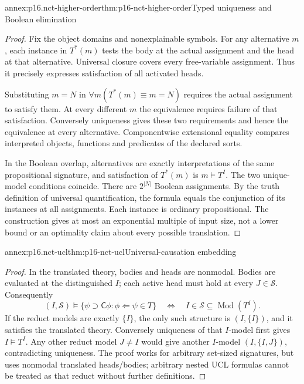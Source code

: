 \begin{annexitem}{annex:p16.nct-higher-order}{thm:p16-nct-higher-order}{Typed uniqueness and Boolean elimination}
\begin{proof}
Fix the object domains and nonexplainable symbols.
For any alternative \(m\), each instance in \(T^*(m)\) tests the body
at the actual assignment and the head at that alternative.
Universal closure covers every free-variable assignment. Thus it
precisely expresses satisfaction of all activated heads.

Substituting \(m=N\) in \(\forall m(T^*(m)\equiv m=N)\) requires
the actual assignment to satisfy them. At every different \(m\) the
equivalence requires failure of that satisfaction. Conversely uniqueness
gives these two requirements and hence the equivalence at every alternative.
Componentwise extensional equality compares interpreted objects, functions
and predicates of the declared sorts.

In the Boolean overlap, alternatives are exactly interpretations of the
same propositional signature, and satisfaction of \(T^*(m)\) is
\(m\models T^I\). The two unique-model conditions coincide.
There are \(2^{|N|}\) Boolean assignments. By the truth definition of
universal quantification, the formula equals the conjunction of its
instances at all assignments. Each instance is ordinary propositional.
The construction gives at most an exponential multiple of input size,
not a lower bound or an optimality claim about every possible translation.
\end{proof}
\end{annexitem}

\begin{annexitem}{annex:p16.nct-ucl}{thm:p16-nct-ucl}{Universal-causation embedding}
\begin{proof}
In the translated theory, bodies and heads are nonmodal.
Bodies are evaluated at the distinguished \(I\); each active head must
hold at every \(J\in\mathcal S\). Consequently
\[
 (I,\mathcal S)\models\{\psi\supset\mathsf C\phi:\phi\Leftarrow\psi\in T\}
 \quad\Longleftrightarrow\quad I\in\mathcal S\subseteq\operatorname{Mod}(T^I).
\]
If the reduct models are exactly \(\{I\}\), the only such structure is
\((I,\{I\})\), and it satisfies the translated theory.
Conversely uniqueness of that \(I\)-model first gives \(I\models T^I\).
Any other reduct model \(J\ne I\) would give another \(I\)-model
\((I,\{I,J\})\), contradicting uniqueness.
The proof works for arbitrary set-sized signatures, but uses nonmodal
translated heads/bodies; arbitrary nested UCL formulas cannot be treated
as that reduct without further definitions.
\end{proof}
\end{annexitem}
